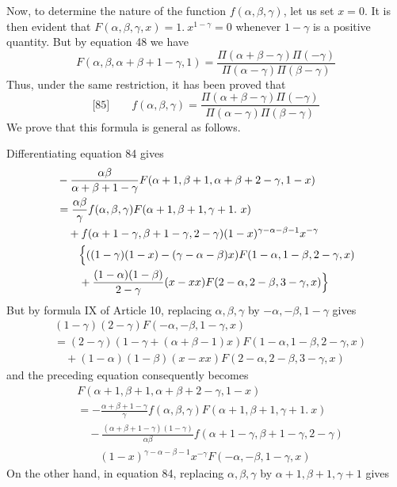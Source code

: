 Now, to determine the nature of the function \(f(\alpha,\beta,\gamma)\), let us set \(x=0\). It is then evident that \(F(\alpha,\beta,\gamma,x)=1.\ x^{1-\gamma}=0\) whenever \(1-\gamma\) is a positive quantity. But by equation 48 we have
\[
F(\alpha,\beta,\alpha+\beta+1-\gamma,1)=\frac{\Pi(\alpha+\beta-\gamma)\Pi(-\gamma)}{\Pi(\alpha-\gamma)\Pi(\beta-\gamma)}
\]
Thus, under the same restriction, it has been proved that
\[
\text{[85]}\qquad f(\alpha,\beta,\gamma)=\frac{\Pi(\alpha+\beta-\gamma)\Pi(-\gamma)}{\Pi(\alpha-\gamma)\Pi(\beta-\gamma)}
\]
We prove that this formula is general as follows.
\par{}
Differentiating equation 84 gives
\[
\begin{aligned}
&-\frac{\alpha\beta}{\alpha+\beta+1-\gamma}F(\alpha+1,\beta+1,\alpha+\beta+2-\gamma,1-x)\\
&=\frac{\alpha\beta}{\gamma}f(\alpha,\beta,\gamma)F(\alpha+1,\beta+1,\gamma+1.\ x)\\
&\quad+f(\alpha+1-\gamma,\beta+1-\gamma,2-\gamma)(1-x)^{\gamma-\alpha-\beta-1}x^{-\gamma}\\&\qquad\Bigl\{((1-\gamma)(1-x)-(\gamma-\alpha-\beta)x)F(1-\alpha,1-\beta,2-\gamma,x)\\
&\qquad+\frac{(1-\alpha)(1-\beta)}{2-\gamma}(x-xx)F(2-\alpha,2-\beta,3-\gamma,x)\Bigr\}
\end{aligned}
\]
But by formula IX of Article 10, replacing \(\alpha,\beta,\gamma\) by \(-\alpha,-\beta,1-\gamma\) gives
\[
\begin{aligned}
&(1-\gamma)(2-\gamma)F(-\alpha,-\beta,1-\gamma,x)\\&=(2-\gamma)(1-\gamma+(\alpha+\beta-1)x)F(1-\alpha,1-\beta,2-\gamma,x)\\
&\quad+(1-\alpha)(1-\beta)(x-xx)F(2-\alpha,2-\beta,3-\gamma,x)
\end{aligned}
\]
and the preceding equation consequently becomes
\[
\begin{aligned}
&F(\alpha+1,\beta+1,\alpha+\beta+2-\gamma,1-x)\\
&=-\frac{\alpha+\beta+1-\gamma}{\gamma}f(\alpha,\beta,\gamma)F(\alpha+1,\beta+1,\gamma+1.\ x)\\
&\quad-\frac{(\alpha+\beta+1-\gamma)(1-\gamma)}{\alpha\beta}f(\alpha+1-\gamma,\beta+1-\gamma,2-\gamma)\\&\qquad(1-x)^{\gamma-\alpha-\beta-1}x^{-\gamma}F(-\alpha,-\beta,1-\gamma,x)
\end{aligned}
\]
On the other hand, in equation 84, replacing \(\alpha,\beta,\gamma\) by \(\alpha+1,\beta+1,\gamma+1\) gives
